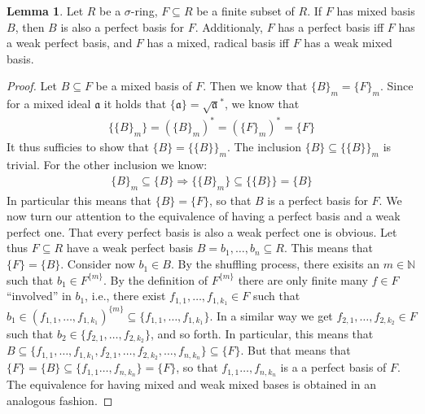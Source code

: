 \documentclass{article}
\def\N{\mathbb{N}}
\def\a{\mathfrak{a}}
\def\s{\sigma}
\newenvironment{bew}{\begin{proof}[Proof]}{\end{proof}}
\theoremstyle{definition}
\newtheorem{lem}[Satz]{Lemma}
\begin{document}
\begin{lem}\label{lemmabases}
Let $R$ be a $\s$-ring, $F \subseteq R$ be a finite subset of $R$. If $F$ has mixed basis $B$, then $B$ is also a perfect basis for $F$. Additionaly, $F$ has a perfect basis iff $F$ has a weak perfect basis, and $F$ has a mixed, radical basis iff $F$ has a weak mixed basis.
\begin{bew}
Let $B \subseteq F$ be a mixed basis of $F$. Then we know that $\{B\}_m = \{F\}_m$.
Since for a mixed ideal $\a$ it holds that $\{\a\} = \sqrt{\a}^*$, we know that
\begin{align*}
\{\{B\}_m\} = (\{B\}_m)^* = (\{F\}_m)^* = \{F\}
\end{align*}
It thus sufficies to show that $\{B\} = \{\{B\}\}_m$.  The inclusion $\{B\} \subseteq \{\{B\}\}_m$ is trivial. For the other inclusion we know:
\begin{align*}
\{ B \}_m \subseteq \{ B \}
\Rightarrow \{ \{B\}_m \} \subseteq \{ \{ B \} \} = \{B \}
\end{align*}
In particular this means that $\{B\} = \{F\}$, so that $B$ is a perfect basis for $F$. 
We now turn our attention to the equivalence of having a perfect basis and a weak perfect one. That every perfect basis is also a weak perfect one is obvious. Let thus $F \subseteq R$ have a weak perfect basis $B = b_1,\ldots,b_n \subseteq R$. 
This means that $\{ F \} = \{ B \}$. Consider now $b_1 \in B$. By the shuffling process, there exisits an $m \in \N$ such that $b_1 \in F^{\{m\}}$. By the definition of $F^{\{m\}}$ there are only finite many $f \in F$ ``involved'' in $b_1$,
i.e., there exist $f_{1,1}, \ldots, f_{1,k_1} \in F$ such that $b_1 \in (f_{1,1}, \ldots, f_{1,k_1})^{\{m\}} \subseteq \{ f_{1,1}, \ldots, f_{1,k_1} \}$. In a similar way  we get $f_{2,1}, \ldots, f_{2,k_2} \in F$ such that $b_2 \in \{ f_{2,1}, \ldots, f_{2,k_2} \}$, and so forth.
In particular, this means that $B \subseteq \{ f_{1,1}, \ldots, f_{1,k_1},f_{2,1}, \ldots, f_{2,k_2}, \ldots, f_{n,k_n} \} \subseteq \{F\}$. But that means  that $\{F\} = \{B\} \subseteq \{ f_{1,1} \ldots, f_{n,k_n}\} = \{F\}$, so that $f_{1,1} \ldots, f_{n,k_n}$ is a a perfect basis of $F$. 
The equivalence for having mixed and weak mixed bases is obtained in an analogous fashion.
\end{bew}
\end{lem}
\end{document}
